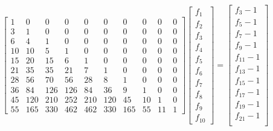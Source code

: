 \documentclass[a4paper,dottedtoc,headinclude,footinclude]{report} %
\theoremstyle{plain}
\begin{document}
    \begin{displaymath}
        \left[
        \begin{array}{cccccccccc}
            1 & 0 & 0 & 0 & 0 & 0 & 0 & 0 & 0 & 0\\
            3 & 1 & 0 & 0 & 0 & 0 & 0 & 0 & 0 & 0\\
            6 & 4 & 1 & 0 & 0 & 0 & 0 & 0 & 0 & 0\\
            10 & 10 & 5 & 1 & 0 & 0 & 0 & 0 & 0 & 0\\
            15 & 20 & 15 & 6 & 1 & 0 & 0 & 0 & 0 & 0\\
            21 & 35 & 35 & 21 & 7 & 1 & 0 & 0 & 0 & 0\\
            28 & 56 & 70 & 56 & 28 & 8 & 1 & 0 & 0 & 0\\
            36 & 84 & 126 & 126 & 84 & 36 & 9 & 1 & 0 & 0\\
            45 & 120 & 210 & 252 & 210 & 120 & 45 & 10 & 1 & 0\\
            55 & 165 & 330 & 462 & 462 & 330 & 165 & 55 & 11 & 1
            \end{array}\right]  \left[
            \begin{array}{c}
                f_{1}\\
                f_{2}\\
                f_{3}\\
                f_{4}\\
                f_{5}\\
                f_{6}\\
                f_{7}\\
                f_{8}\\
                f_{9}\\
                f_{10}\end{array}\right] = \left[
            \begin{array}{c}
                f_{3} - 1\\
                f_{5} - 1\\
                f_{7} - 1\\
                f_{9} - 1\\
                f_{11} - 1\\
                f_{13} - 1\\
                f_{15} - 1\\
                f_{17} - 1\\
                f_{19} - 1\\
                f_{21} - 1\\
                \end{array}\right]
    \end{displaymath}
\end{document}
